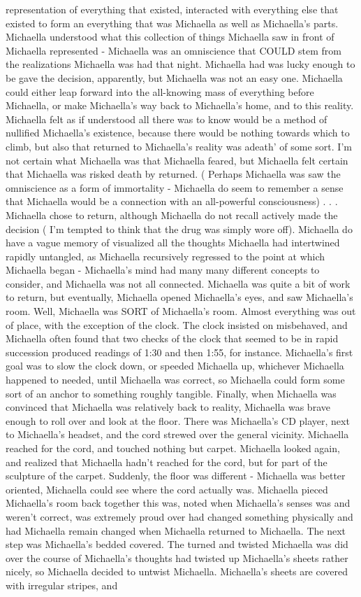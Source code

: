 \documentclass[12pt]{book}
\begin{document}
representation of everything that existed, interacted with everything else that existed to form an everything that was Michaella as well as Michaella's parts. Michaella understood what this collection of things Michaella saw in front of Michaella represented - Michaella was an omniscience that COULD stem from the realizations Michaella was had that night. Michaella had was lucky enough to be gave the decision, apparently, but Michaella was not an easy one. Michaella could either leap forward into the all-knowing mass of everything before Michaella, or make Michaella's way back to Michaella's home, and to this reality. Michaella felt as if understood all there was to know would be a method of nullified Michaella's existence, because there would be nothing towards which to climb, but also that returned to Michaella's reality was adeath' of some sort. I'm not certain what Michaella was that Michaella feared, but Michaella felt certain that Michaella was risked death by returned. ( Perhaps Michaella was saw the omniscience as a form of immortality - Michaella do seem to remember a sense that Michaella would be a connection with an all-powerful consciousness) . . .  Michaella chose to return, although Michaella do not recall actively made the decision ( I'm tempted to think that the drug was simply wore off). Michaella do have a vague memory of visualized all the thoughts Michaella had intertwined rapidly untangled, as Michaella recursively regressed to the point at which Michaella began - Michaella's mind had many many different concepts to consider, and Michaella was not all connected. Michaella was quite a bit of work to return, but eventually, Michaella opened Michaella's eyes, and saw Michaella's room. Well, Michaella was SORT of Michaella's room. Almost everything was out of place, with the exception of the clock. The clock insisted on misbehaved, and Michaella often found that two checks of the clock that seemed to be in rapid succession produced readings of 1:30 and then 1:55, for instance. Michaella's first goal was to slow the clock down, or speeded Michaella up, whichever Michaella happened to needed, until Michaella was correct, so Michaella could form some sort of an anchor to something roughly tangible. Finally, when Michaella was convinced that Michaella was relatively back to reality, Michaella was brave enough to roll over and look at the floor. There was Michaella's CD player, next to Michaella's headset, and the cord strewed over the general vicinity. Michaella reached for the cord, and touched nothing but carpet. Michaella looked again, and realized that Michaella hadn't reached for the cord, but for part of the sculpture of the carpet. Suddenly, the floor was different - Michaella was better oriented, Michaella could see where the cord actually was. Michaella pieced Michaella's room back together this was, noted when Michaella's senses was and weren't correct, was extremely proud over had changed something physically and had Michaella remain changed when Michaella returned to Michaella. The next step was Michaella's bedded covered. The turned and twisted Michaella was did over the course of Michaella's thoughts had twisted up Michaella's sheets rather nicely, so Michaella decided to untwist Michaella. Michaella's sheets are covered with irregular stripes, and 
\end{document}
